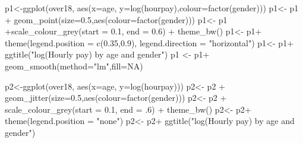 \documentclass[
]{gitbook}
\newenvironment{Shaded}{\begin{snugshade}}{\end{snugshade}}
\newcommand{\AttributeTok}[1]{\textcolor[rgb]{0.77,0.63,0.00}{#1}}
\newcommand{\ConstantTok}[1]{\textcolor[rgb]{0.00,0.00,0.00}{#1}}
\newcommand{\DecValTok}[1]{\textcolor[rgb]{0.00,0.00,0.81}{#1}}
\newcommand{\FloatTok}[1]{\textcolor[rgb]{0.00,0.00,0.81}{#1}}
\newcommand{\FunctionTok}[1]{\textcolor[rgb]{0.00,0.00,0.00}{#1}}
\newcommand{\NormalTok}[1]{#1}
\newcommand{\OtherTok}[1]{\textcolor[rgb]{0.56,0.35,0.01}{#1}}
\newcommand{\SpecialCharTok}[1]{\textcolor[rgb]{0.00,0.00,0.00}{#1}}
\newcommand{\StringTok}[1]{\textcolor[rgb]{0.31,0.60,0.02}{#1}}
\begin{document}
\footnotesize

\begin{Shaded}
\begin{Highlighting}[]
\NormalTok{p1}\OtherTok{\textless{}{-}}\FunctionTok{ggplot}\NormalTok{(over18, }\FunctionTok{aes}\NormalTok{(}\AttributeTok{x=}\NormalTok{age, }\AttributeTok{y=}\FunctionTok{log}\NormalTok{(hourpay),}\AttributeTok{colour=}\FunctionTok{factor}\NormalTok{(gender)))}
\NormalTok{p1}\OtherTok{\textless{}{-}}\NormalTok{ p1 }\SpecialCharTok{+} \FunctionTok{geom\_point}\NormalTok{(}\AttributeTok{size=}\FloatTok{0.5}\NormalTok{,}\FunctionTok{aes}\NormalTok{(}\AttributeTok{colour=}\FunctionTok{factor}\NormalTok{(gender)))}
\NormalTok{p1}\OtherTok{\textless{}{-}}\NormalTok{ p1 }\SpecialCharTok{+}\FunctionTok{scale\_colour\_grey}\NormalTok{(}\AttributeTok{start =} \FloatTok{0.1}\NormalTok{, }\AttributeTok{end =} \FloatTok{0.6}\NormalTok{)  }\SpecialCharTok{+} \FunctionTok{theme\_bw}\NormalTok{()}
\NormalTok{p1}\OtherTok{\textless{}{-}}\NormalTok{ p1}\SpecialCharTok{+} \FunctionTok{theme}\NormalTok{(}\AttributeTok{legend.position =} \FunctionTok{c}\NormalTok{(}\FloatTok{0.35}\NormalTok{,}\FloatTok{0.9}\NormalTok{), }
               \AttributeTok{legend.direction =} \StringTok{"horizontal"}\NormalTok{)}
\NormalTok{p1}\OtherTok{\textless{}{-}}\NormalTok{ p1}\SpecialCharTok{+} \FunctionTok{ggtitle}\NormalTok{(}\StringTok{"log(Hourly pay) by age and gender"}\NormalTok{)}
\NormalTok{p1 }\OtherTok{\textless{}{-}}\NormalTok{ p1}\SpecialCharTok{+} \FunctionTok{geom\_smooth}\NormalTok{(}\AttributeTok{method=}\StringTok{"lm"}\NormalTok{,}\AttributeTok{fill=}\ConstantTok{NA}\NormalTok{)}


\NormalTok{p2}\OtherTok{\textless{}{-}}\FunctionTok{ggplot}\NormalTok{(over18, }\FunctionTok{aes}\NormalTok{(}\AttributeTok{x=}\NormalTok{age, }\AttributeTok{y=}\FunctionTok{log}\NormalTok{(hourpay))) }
\NormalTok{p2}\OtherTok{\textless{}{-}}\NormalTok{ p2 }\SpecialCharTok{+} \FunctionTok{geom\_jitter}\NormalTok{(}\AttributeTok{size=}\FloatTok{0.5}\NormalTok{,}\FunctionTok{aes}\NormalTok{(}\AttributeTok{colour=}\FunctionTok{factor}\NormalTok{(gender))) }
\NormalTok{p2}\OtherTok{\textless{}{-}}\NormalTok{  p2 }\SpecialCharTok{+} \FunctionTok{scale\_colour\_grey}\NormalTok{(}\AttributeTok{start =} \FloatTok{0.1}\NormalTok{, }\AttributeTok{end =}\NormalTok{ .}\DecValTok{6}\NormalTok{)  }\SpecialCharTok{+} \FunctionTok{theme\_bw}\NormalTok{()}
\NormalTok{p2}\OtherTok{\textless{}{-}}\NormalTok{ p2}\SpecialCharTok{+} \FunctionTok{theme}\NormalTok{(}\AttributeTok{legend.position =} \StringTok{"none"}\NormalTok{)}
\NormalTok{p2}\OtherTok{\textless{}{-}}\NormalTok{ p2}\SpecialCharTok{+} \FunctionTok{ggtitle}\NormalTok{(}\StringTok{"log(Hourly pay) by age and gender"}\NormalTok{)}
\end{Highlighting}
\end{Shaded}
\end{document}
